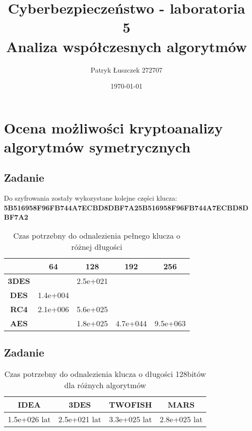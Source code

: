 \documentclass{article}
\title{%
  Cyberbezpieczeństwo - laboratoria 5 \\
  \large Analiza współczesnych algorytmów}
\author{Patryk Łuszczek 272707}
\date{\today}
\begin{document}
\maketitle
\newpage
\tableofcontents
\newpage

\section{Ocena możliwości kryptoanalizy algorytmów symetrycznych}
\subsection{Zadanie}
Do szyfrowania zostały wykozystane kolejne części klucza: \\ \textbf{5B516958F96FB744A7ECBD8DBF7A25B516958F96FB744A7ECBD8DBF7A2}

\begin{table}[H]
    \centering
    \caption{Czas potrzebny do odnalezienia pełnego klucza o różnej długości}
    \begin{tabular}{|c|c|c|c|c|}
        \hline
                      & \textbf{64} & \textbf{128} & \textbf{192} & \textbf{256} \\ \hline
        \textbf{3DES} &             & 2.5e+021     &              &              \\ \hline
        \textbf{DES}  & 1.4e+004    &              &              &              \\ \hline
        \textbf{RC4}  & 2.1e+006    & 5.6e+025     &              &              \\ \hline
        \textbf{AES}  &             & 1.8e+025     & 4.7e+044     & 9.5e+063     \\ \hline
    \end{tabular}
\end{table}

\subsection{Zadanie}

\begin{table}[H]
    \centering
    \caption{Czas potrzebny do odnalezienia klucza o długości 128bitów dla różnych algorytmów}
    \begin{tabular}{|c|c|c|c|}
        \hline
        \textbf{IDEA} & \textbf{3DES} & \textbf{TWOFISH} & \textbf{MARS} \\ \hline
        1.5e+026 lat  & 2.5e+021 lat  & 3.3e+025 lat     & 2.8e+025 lat  \\ \hline
    \end{tabular}
\end{table}
\end{document}

